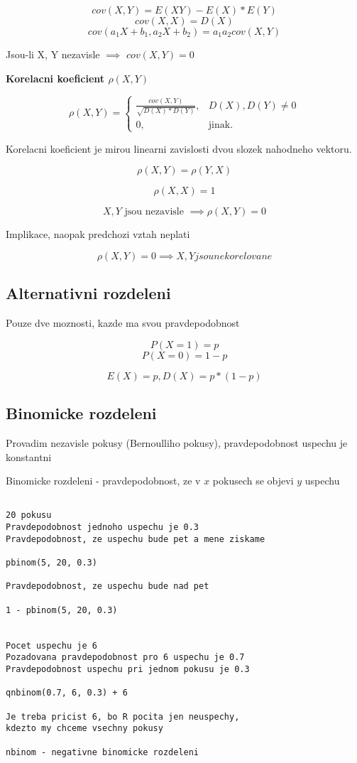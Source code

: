 \documentclass{article}
\begin{document}
\[ cov(X, Y) = E(XY) - E(X)*E(Y) \]
\[ cov(X,X) = D(X) \]
\[ cov(a_1X + b_1, a_2X + b_2) = a_1a_2cov(X,Y) \]

Jsou-li X, Y nezavisle $\implies$ $cov(X,Y) = 0$

\textbf{Korelacni koeficient $\rho(X, Y)$}

\begin{equation}
    \rho(X,Y)=\begin{cases}
    \frac { cov(X,Y) } { \sqrt{D(X) * D(Y)} }, & D(X), D(Y) \neq 0\\
    0, & \text{jinak}.
  \end{cases}
\end{equation}

Korelacni koeficient je mirou linearni zavislosti dvou slozek nahodneho vektoru.

\[ \rho(X, Y) = \rho(Y, X) \]

\[ \rho(X, X) = 1 \]

\[ X, Y \text{ jsou nezavisle } \implies \rho(X, Y) = 0 \]

Implikace, naopak predchozi vztah neplati

\[ \rho(X, Y) = 0 \implies X, Y jsou nekorelovane \]

\subsection{Alternativni rozdeleni}

Pouze dve moznosti, kazde ma svou pravdepodobnost

\[ P(X=1) = p \]
\[ P(X=0) = 1-p \]

\[ E(X) = p, D(X) = p * (1 - p) \]

\subsection{Binomicke rozdeleni}

Provadim nezavisle pokusy (Bernoulliho pokusy), pravdepodobnost uspechu je konstantni

Binomicke rozdeleni - pravdepodobnost, ze v $x$ pokusech se objevi $y$ uspechu

\begin{verbatim}

20 pokusu
Pravdepodobnost jednoho uspechu je 0.3
Pravdepodobnost, ze uspechu bude pet a mene ziskame

pbinom(5, 20, 0.3)

Pravdepodobnost, ze uspechu bude nad pet

1 - pbinom(5, 20, 0.3)


Pocet uspechu je 6
Pozadovana pravdepodobnost pro 6 uspechu je 0.7
Pravdepodobnost uspechu pri jednom pokusu je 0.3

qnbinom(0.7, 6, 0.3) + 6

Je treba pricist 6, bo R pocita jen neuspechy, 
kdezto my chceme vsechny pokusy

nbinom - negativne binomicke rozdeleni

\end{verbatim}
\end{document}
